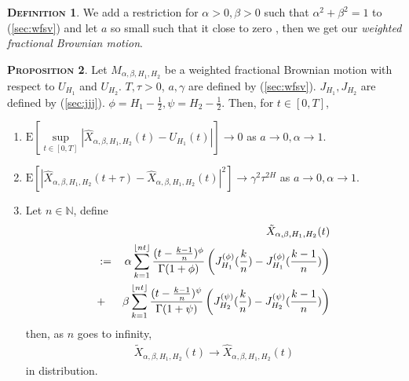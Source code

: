 \documentclass[a4paper, twoside, 11pt]{article}
\theoremstyle{definition}
\newtheorem{definition}{\scshape Definition}[section]
\newtheorem{proposition}[definition]{\scshape Proposition}
\DeclarePairedDelimiter\floor{\lfloor}{\rfloor}
\newcommand{\brkt}[1]{\left({#1} \right)}
\begin{document}
  \begin{definition}
	We add a restriction for $\alpha > 0, \beta > 0$ such that $\alpha^2 + \beta^2 = 1$ to (\ref{sec:wfsv}) and let $a$ so small such that it close to zero , then we get our \emph{weighted fractional Brownian motion}.
  \end{definition}
  
\begin{proposition}
  Let $M_{\alpha,\beta,H_1,H_2}$ be a weighted fractional Brownian motion with \\respect to $U_{H_1}$ and $U_{H_2}$. $T, \tau>0$, $a, \gamma$ are defined by (\ref{sec:wfsv}). $J_{H_1}, J_{H_2}$ are defined by (\ref{sec:jjj}). $\phi=H_1-\frac{1}{2}, \psi=H_2-\frac{1}{2}$. Then, for $t\in [0, T]$,
\begin{enumerate}[topsep=0pt, itemsep=-1ex, partopsep=1ex, parsep=1ex, label=(\roman*)]	
  \item $\mathrm{E}[\sup\limits_{t\in[0,T]}|\hat{X}_{\alpha,\beta,H_1,H_2}(t) - U_{H_1}(t)|] \rightarrow 0$
	as $a\rightarrow 0, \alpha\rightarrow 1$.
  \item $\mathrm{E}[|\hat{X}_{\alpha,\beta,H_1,H_2}(t+\tau) - \hat{X}_{\alpha,\beta,H_1,H_2}(t)|^2] \rightarrow  \gamma^2 \tau^{2H}$
	as $a\rightarrow 0, \alpha\rightarrow 1$.
  \item Let $n\in \mathbb{N}$, define
	\begin{eqnarray*}
	  &&\tilde{X}_{\alpha,\beta,H_1,H_2}(t) \\
	  &:=&  \alpha\sum_{k=1}^{\floor{nt}} \frac{(t - \frac{k-1}{n})^\phi}{\Gamma(1+\phi)} \brkt{J_{H_1}^{(\phi)}(\frac{k}{n}) - J_{H_1}^{(\phi)}(\frac{k-1}{n})} \\
	  &+& \beta\sum_{k=1}^{\floor{nt}} \frac{(t - \frac{k-1}{n})^\psi}{\Gamma(1+\psi)} \brkt{J_{H_2}^{(\psi)}(\frac{k}{n}) - J_{H_2}^{(\psi)}(\frac{k-1}{n})}
	  \label{sec:disc}
	\end{eqnarray*}
	then, as $n$ goes to infinity,
	\begin{eqnarray*}
	  \tilde{X}_{\alpha,\beta,H_1,H_2}(t) \rightarrow \hat{X}_{\alpha,\beta,H_1,H_2}(t)
	\end{eqnarray*}
	in distribution.
  \end{enumerate}
  \end{proposition}
\end{document}
